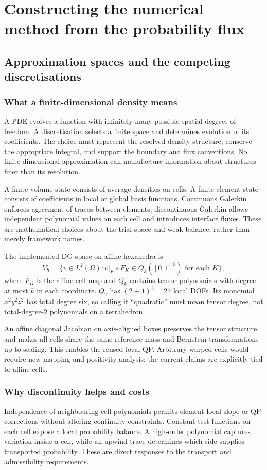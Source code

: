 \part{Constructing the numerical method from the probability flux}
\chapter{Approximation spaces and the competing discretisations}\label{ch:spaces}
\section{What a finite-dimensional density means}
A PDE evolves a function with infinitely many possible spatial degrees of freedom. A discretisation selects a finite space and determines evolution of its coefficients. The choice must represent the resolved density structure, conserve the appropriate integral, and support the boundary and flux conventions. No finite-dimensional approximation can manufacture information about structures finer than its resolution.

A finite-volume state consists of average densities on cells. A finite-element state consists of coefficients in local or global basis functions. Continuous Galerkin enforces agreement of traces between elements; discontinuous Galerkin allows independent polynomial values on each cell and introduces interface fluxes. These are mathematical choices about the trial space and weak balance, rather than merely framework names.

The implemented DG space on affine hexahedra is
\begin{equation}\label{eq:dg-space}
V_h=\{v\in L^2(\Omega):v|_K\circ F_K\in Q_k([0,1]^3)\text{ for each }K\},
\end{equation}
where $F_K$ is the affine cell map and $Q_k$ contains tensor polynomials with degree at most $k$ in each coordinate. $Q_2$ has $(2+1)^3=27$ local DOFs. Its monomial $x^2y^2z^2$ has total degree six, so calling it ``quadratic'' must mean tensor degree, not total-degree-$2$ polynomials on a tetrahedron.

An affine diagonal Jacobian on axis-aligned boxes preserves the tensor structure and makes all cells share the same reference mass and Bernstein transformations up to scaling. This enables the reused local QP. Arbitrary warped cells would require new mapping and positivity analysis; the current claims are explicitly tied to affine cells.

\section{Why discontinuity helps and costs}
Independence of neighbouring cell polynomials permits element-local slope or QP corrections without altering continuity constraints. Constant test functions on each cell expose a local probability balance. A high-order polynomial captures variation inside a cell, while an upwind trace determines which side supplies transported probability. These are direct responses to the transport and admissibility requirements.

